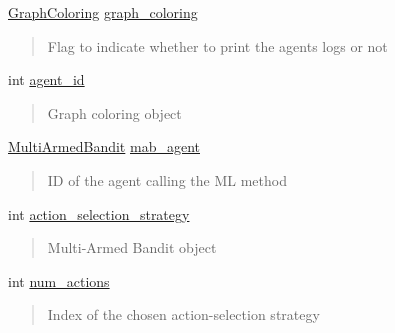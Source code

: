 \begin{DoxyCompactItemize}
\hyperlink{classGraphColoring}{Graph\+Coloring} \hyperlink{classMlModel_a3661d0ceeb731a506b28886cddd23e03}{graph\+\_\+coloring}
\begin{DoxyCompactList}\small\item\em \begin{quote}
Flag to indicate whether to print the agents logs or not \end{quote}
\end{DoxyCompactList}\item 
\mbox{\label{classMlModel_adf07a8bdeaffaa6f7a59f2b1ac3beaca}} 
int \hyperlink{classMlModel_adf07a8bdeaffaa6f7a59f2b1ac3beaca}{agent\+\_\+id}
\begin{DoxyCompactList}\small\item\em \begin{quote}
Graph coloring object \end{quote}
\end{DoxyCompactList}\item 
\mbox{\label{classMlModel_a2275d5999058ae5a3b1b90b979692a73}} 
\hyperlink{classMultiArmedBandit}{Multi\+Armed\+Bandit} \hyperlink{classMlModel_a2275d5999058ae5a3b1b90b979692a73}{mab\+\_\+agent}
\begin{DoxyCompactList}\small\item\em \begin{quote}
ID of the agent calling the ML method \end{quote}
\end{DoxyCompactList}\item 
\mbox{\label{classMlModel_a5936fbf7e2ebf1676ac8fd53eb9283c7}} 
int \hyperlink{classMlModel_a5936fbf7e2ebf1676ac8fd53eb9283c7}{action\+\_\+selection\+\_\+strategy}
\begin{DoxyCompactList}\small\item\em \begin{quote}
Multi-\/\+Armed Bandit object \end{quote}
\end{DoxyCompactList}\item 
\mbox{\label{classMlModel_af95e012035256910b23ffc83cb737534}} 
int \hyperlink{classMlModel_af95e012035256910b23ffc83cb737534}{num\+\_\+actions}
\begin{DoxyCompactList}\small\item\em \begin{quote}
Index of the chosen action-\/selection strategy \end{quote}
\end{DoxyCompactList}\end{DoxyCompactItemize}


